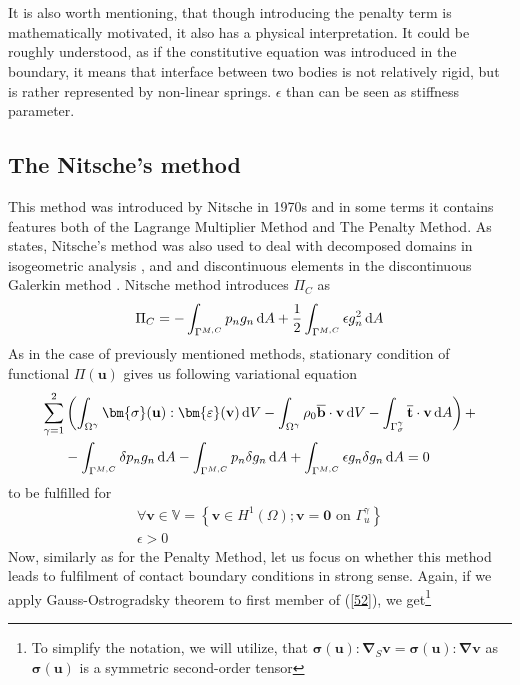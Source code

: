 \documentclass{article}
\newcommand{\beq}{\begin{equation}}
\newcommand{\eeq}{\end{equation}}
\newcommand{\bea}{\begin{eqnarray}}
\newcommand{\eea}{\end{eqnarray}}
\newcommand{\dd}{\,{\rm d}}
\begin{document}
\\
\\
It is also worth mentioning, that though introducing the penalty term is mathematically motivated, it also has a physical interpretation. It could be roughly understood, as if the constitutive equation was introduced in the boundary, it means that interface between two bodies is not relatively rigid, but is rather represented by non-linear springs. $\epsilon$ than can be seen as stiffness parameter.   
\subsection{The Nitsche's method}
This method was introduced by Nitsche in 1970s \cite{Nitsche} and in some terms it contains features both of the Lagrange Multiplier Method and The Penalty Method. As \cite{Augarde} states, Nitsche's method was also used to deal with decomposed domains in isogeometric analysis \cite{Apostolatos}, \cite{Ruess} and and discontinuous elements in the discontinuous Galerkin method \cite{Hansbo}. Nitsche method introduces $\Pi_{C}$ as 
\beq\label{59}
\Pi_{C} = -\int_{\Gamma^{M,C}} p_{n} g_{n}\dd A+\frac{1}{2}\int_{\Gamma^{M,C}} \epsilon g^{2}_{n}\dd A
\eeq   
As in the case of previously mentioned methods, stationary condition of functional $\Pi (\mathbf{u})$ gives us following variational equation
\bea\label{60}
\begin{aligned}
\sum^{2}_{\gamma = 1}&\left(\int_{\Omega^{\gamma}} \bm{\sigma}(\mathbf{u}) : \bm{\varepsilon}(\mathbf{v}) \dd V-\int_{\Omega^{\gamma}} \rho_{0}\overline{\mathbf{b}} \cdot \mathbf{v} \dd V-\int_{\Gamma_{\sigma}^{\gamma}} \overline{\mathbf{t}} \cdot \mathbf{\mathbf{v}} \dd A\right)+
\\
&-\int_{\Gamma^{M,C}} \delta p_{n} g_{n}\dd A-\int_{\Gamma^{M,C}} p_{n} \delta g_{n}\dd A+\int_{\Gamma^{M,C}} \epsilon g_{n} \delta g_{n} \dd A = 0
\end{aligned}
\eea
to be fulfilled for    
\beq\label{61}
\begin{array}{c}
{\forall\mathbf{v}\in {\mathbb{V}=\left\{\mathbf{v} \in H^{1}(\Omega); \mathbf{v}=\mathbf{0} \text { on } \Gamma_{u}^{\gamma}\right\}}}
\\
{\epsilon > 0}
\end{array}
\eeq 
Now, similarly as for the Penalty Method, let us focus on whether this method leads to fulfilment of contact boundary conditions in strong sense. Again, if we apply Gauss-Ostrogradsky theorem to first member of (\ref{52}), we get\footnote{To simplify the notation, we will utilize, that $  \bm{\sigma}(\mathbf{u}) : \bm{\nabla}_{S}\mathbf{v} = \bm{\sigma}(\mathbf{u}) : \bm{\nabla}\mathbf{v} $ as $\bm{\sigma}(\mathbf{u})$ is a symmetric second-order tensor}
\end{document}
